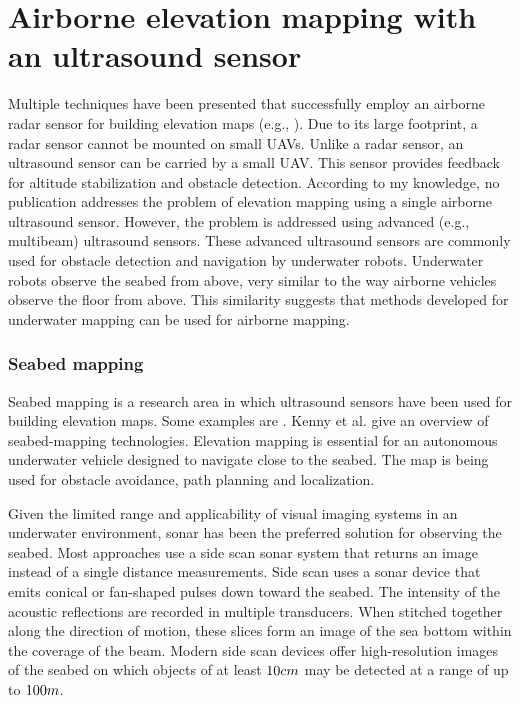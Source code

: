 \section{Airborne elevation mapping with an ultrasound sensor}
\label{sec:related-research-elevation-mapping}
Multiple techniques have been presented that successfully employ an airborne radar sensor for building elevation maps (e.g., \cite{foessel2000radar, weiß2006airborne}).
Due to its large footprint, a radar sensor cannot be mounted on small UAVs.
Unlike a radar sensor, an ultrasound sensor can be carried by a small UAV.
This sensor provides feedback for altitude stabilization and obstacle detection.
According to my knowledge, no publication addresses the problem of elevation mapping using a single airborne ultrasound sensor.
However, the problem is addressed using advanced (e.g., multibeam) ultrasound sensors.
These advanced ultrasound sensors are commonly used for obstacle detection and navigation by underwater robots.
Underwater robots observe the seabed from above, very similar to the way airborne vehicles observe the floor from above.
This similarity suggests that methods developed for underwater mapping can be used for airborne mapping.

\subsubsection{Seabed mapping}
Seabed mapping is a research area in which ultrasound sensors have been used for building elevation maps. Some examples are \cite{johnson1996seafloor,strauss1999multibeam,zerr1996three,evans2002three}.
Kenny et al. \cite{kenny2003overview} give an overview of seabed-mapping technologies.
Elevation mapping is essential for an autonomous underwater vehicle designed to navigate close to the seabed.
The map is being used for obstacle avoidance, path planning and localization.

Given the limited range and applicability of visual imaging systems in an underwater environment,
sonar has been the preferred solution \cite{blondel1997handbook} for observing the seabed.
Most approaches use a side scan sonar system that returns an image instead of a single distance measurements.
Side scan uses a sonar device that emits conical or fan-shaped pulses down toward the seabed.
The intensity of the acoustic reflections are recorded in multiple transducers.
When stitched together along the direction of motion, these slices form an image of the sea bottom within the coverage of the beam.
Modern side scan devices offer high-resolution images of the seabed on which objects of at least $10\begin{small}cm\end{small}$ may be detected at a range of up to $100\begin{small}m\end{small}$.

